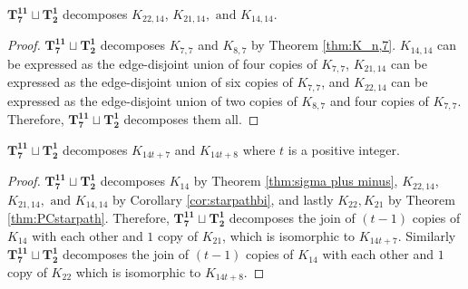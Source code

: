 \documentclass{dmgt}
\begin{document}
\begin{cor}\label{cor:starpathbi}
    $\mathbf{T_{7}^{11}}\sqcup\mathbf{T_{2}^{1}}$ decomposes $K_{22,14}$, $K_{21,14},\text{ and }K_{14,14}$.
\end{cor}

\begin{proof}
    $\mathbf{T_{7}^{11}}\sqcup\mathbf{T_{2}^{1}}$ decomposes $K_{7,7}$ and $K_{8,7}$ by Theorem \ref{thm:K_n,7}. $K_{14,14}$ can be expressed as the edge-disjoint union of four copies of $K_{7,7}$, $K_{21,14}$ can be expressed as the edge-disjoint union of six copies of $K_{7,7}$, and $K_{22,14}$ can be expressed as the edge-disjoint union of two copies of $K_{8,7}$ and four copies of $K_{7,7}$. Therefore, $\mathbf{T_{7}^{11}}\sqcup\mathbf{T_{2}^{1}}$ decomposes them all.
\end{proof}

\begin{theorem}
$\mathbf{T_{7}^{11}}\sqcup\mathbf{T_{2}^{1}}$ decomposes $K_{14t+7}$ and $K_{14t+8}$ where $t$ is a positive integer. 
\end{theorem}
\begin{proof}
$\mathbf{T_{7}^{11}}\sqcup\mathbf{T_{2}^{1}}$ decomposes $K_{14}$ by Theorem \ref{thm:sigma plus minus}, $K_{22,14}$, $K_{21,14},\text{ and }K_{14,14}$ by Corollary \ref{cor:starpathbi}, and lastly $K_{22},K_{21}$ by Theorem \ref{thm:PCstarpath}.
\newline\newline
Therefore, $\mathbf{T_{7}^{11}}\sqcup\mathbf{T_{2}^{1}}$ decomposes the join of $(t-1)$ copies of $K_{14}$ with each other and $1$ copy of $K_{21}$, which is isomorphic to $K_{14t+7}$. Similarly $\mathbf{T_{7}^{11}}\sqcup\mathbf{T_{2}^{1}}$ decomposes the join of $(t-1)$ copies of $K_{14}$ with each other and $1$ copy of $K_{22}$ which is isomorphic to $K_{14t+8}$.
\end{proof}
\newpage
\end{document}
